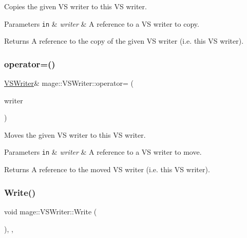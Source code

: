 Copies the given VS writer to this VS writer.


\begin{DoxyParams}[1]{Parameters}
\mbox{\tt in}  & {\em writer} & A reference to a VS writer to copy. \\
\hline
\end{DoxyParams}
\begin{DoxyReturn}{Returns}
A reference to the copy of the given VS writer (i.\+e. this VS writer). 
\end{DoxyReturn}
\hypertarget{classmage_1_1_v_s_writer_af1dca5c791cfb62967cd2437f7db170a}{}\label{classmage_1_1_v_s_writer_af1dca5c791cfb62967cd2437f7db170a} 
\subsubsection{\texorpdfstring{operator=()}{operator=()}\hspace{0.1cm}{\footnotesize\ttfamily [2/2]}}
{\footnotesize\ttfamily \hyperlink{classmage_1_1_v_s_writer}{V\+S\+Writer}\& mage\+::\+V\+S\+Writer\+::operator= (\begin{DoxyParamCaption}\item[{\hyperlink{classmage_1_1_v_s_writer}{V\+S\+Writer} \&\&}]{writer }\end{DoxyParamCaption})\hspace{0.3cm}{\ttfamily [delete]}}

Moves the given VS writer to this VS writer.


\begin{DoxyParams}[1]{Parameters}
\mbox{\tt in}  & {\em writer} & A reference to a VS writer to move. \\
\hline
\end{DoxyParams}
\begin{DoxyReturn}{Returns}
A reference to the moved VS writer (i.\+e. this VS writer). 
\end{DoxyReturn}
\hypertarget{classmage_1_1_v_s_writer_a417c8bcf7ab26e88b253e9ffbdb60192}{}\label{classmage_1_1_v_s_writer_a417c8bcf7ab26e88b253e9ffbdb60192} 
\subsubsection{\texorpdfstring{Write()}{Write()}}
{\footnotesize\ttfamily void mage\+::\+V\+S\+Writer\+::\+Write (\begin{DoxyParamCaption}{ }\end{DoxyParamCaption})\hspace{0.3cm}{\ttfamily [override]}, {\ttfamily [private]}, {\ttfamily [virtual]}}

